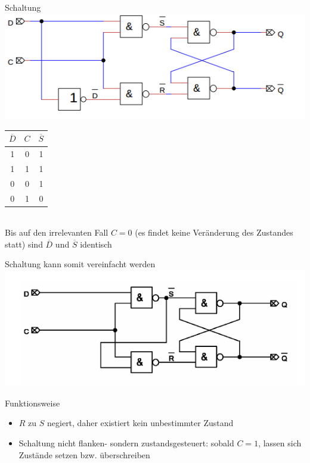 \documentclass[compress,11pt]{beamer}
\begin{document}
\begin{frame}
\begin{block}{Schaltung}
\includegraphics[scale=1]{dlatch1}

\end{block}

\end{frame}
\begin{frame}\begin{tabular}{|c|c||c|}
\hline 
$\overline{D}$ & $C$ & $\overline{S}$ \\ 
\hline 
1 & 0 & 1 \\ 

1 & 1 & 1 \\ 

0 & 0 & 1 \\ 

0 & 1 & 0 \\ 
\hline
\end{tabular} \\
Bis auf den irrelevanten Fall $C = 0$ (es findet keine Veränderung des Zustandes statt) sind $\overline{D}$ und $\overline{S}$ identisch
\end{frame}
\begin{frame}
\begin{block}{Schaltung kann somit vereinfacht werden}
\includegraphics[scale=0.7]{dlatcheinfach}
\end{block}
\end{frame}
\begin{frame}
\begin{block}{Funktionsweise}
\begin{itemize}
\item $R$ zu $S$ negiert, daher existiert kein unbestimmter Zustand
\item Schaltung nicht flanken- sondern zustandsgesteuert: sobald $C = 1$, lassen sich Zustände setzen bzw. überschreiben
\end{itemize}
\end{block}
\end{frame}
\end{document}
